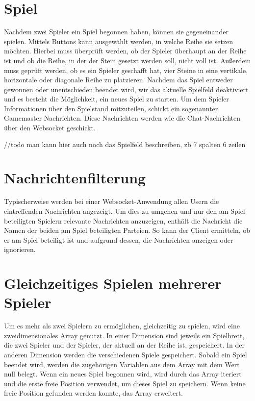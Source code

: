 \section{Spiel}\label{sec:Spiel}
Nachdem zwei Spieler ein Spiel begonnen haben, können sie gegeneinander spielen. Mittels Buttons kann ausgewählt werden, in welche Reihe sie setzen möchten. Hierbei muss überprüft werden, ob der Spieler überhaupt an der Reihe ist und ob die Reihe, in der der Stein gesetzt werden soll, nicht voll ist. Außerdem muss geprüft werden, ob es ein Spieler geschafft hat, vier Steine in eine vertikale, horizontale oder diagonale Reihe zu platzieren. Nachdem das Spiel entweder gewonnen oder unentschieden beendet wird, wir das aktuelle Spielfeld deaktiviert und es besteht die Möglichkeit, ein neues Spiel zu starten. Um dem Spieler Informationen über den Spielstand mitzuteilen, schickt ein sogenannter Gamemaster Nachrichten.  Diese Nachrichten werden wie die Chat-Nachrichten über den Websocket geschickt.

//todo man kann hier auch noch das Spielfeld beschreiben, zb 7 spalten 6 zeilen

\section{Nachrichtenfilterung}\label{sec:Nachrichtenfilter}
Typischerweise werden bei einer Websocket-Anwendung allen Usern die eintreffenden Nachrichten angezeigt. Um dies zu umgehen und nur den am Spiel beteiligten Spielern relevante Nachrichten anzuzeigen, enthält die Nachricht die Namen der beiden am Spiel beteiligten Parteien. So kann der Client ermitteln, ob er am Spiel beteiligt ist und aufgrund dessen, die Nachrichten anzeigen oder ignorieren. 

\section{Gleichzeitiges Spielen mehrerer Spieler}\label{sec:Multiplegames}
Um es mehr als zwei Spielern zu ermöglichen, gleichzeitig zu spielen, wird eine zweidimensionales Array genutzt. In einer Dimension sind jeweils ein Spielbrett, die zwei Spieler und der Spieler, der aktuell an der Reihe ist, gespeichert. In der anderen Dimension werden die verschiedenen Spiele gespeichert. Sobald ein Spiel beendet wird, werden die zugehörigen Variablen aus dem Array mit dem Wert null belegt. Wenn ein neues Spiel begonnen wird, wird durch das Array iteriert und die erste freie Position verwendet, um dieses Spiel zu speichern. Wenn keine freie Position gefunden werden konnte, das Array erweitert. 

